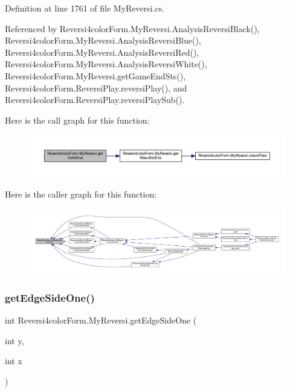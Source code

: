 Definition at line 1761 of file My\+Reversi.\+cs.



Referenced by Reversi4color\+Form.\+My\+Reversi.\+Analysis\+Reversi\+Black(), Reversi4color\+Form.\+My\+Reversi.\+Analysis\+Reversi\+Blue(), Reversi4color\+Form.\+My\+Reversi.\+Analysis\+Reversi\+Red(), Reversi4color\+Form.\+My\+Reversi.\+Analysis\+Reversi\+White(), Reversi4color\+Form.\+My\+Reversi.\+get\+Game\+End\+Sts(), Reversi4color\+Form.\+Reversi\+Play.\+reversi\+Play(), and Reversi4color\+Form.\+Reversi\+Play.\+reversi\+Play\+Sub().

Here is the call graph for this function\+:\nopagebreak
\begin{figure}[H]
\begin{center}
\leavevmode
\includegraphics[width=350pt]{class_reversi4color_form_1_1_my_reversi_a5c18ae70cd8a10fee96f44e3a0e8621b_cgraph}
\end{center}
\end{figure}
Here is the caller graph for this function\+:\nopagebreak
\begin{figure}[H]
\begin{center}
\leavevmode
\includegraphics[width=350pt]{class_reversi4color_form_1_1_my_reversi_a5c18ae70cd8a10fee96f44e3a0e8621b_icgraph}
\end{center}
\end{figure}
\mbox{\label{class_reversi4color_form_1_1_my_reversi_abf9583e4d29970acf85e662eb8a273dc}} 
\subsubsection{\texorpdfstring{get\+Edge\+Side\+One()}{getEdgeSideOne()}}
{\footnotesize\ttfamily int Reversi4color\+Form.\+My\+Reversi.\+get\+Edge\+Side\+One (\begin{DoxyParamCaption}\item[{int}]{y,  }\item[{int}]{x }\end{DoxyParamCaption})}



